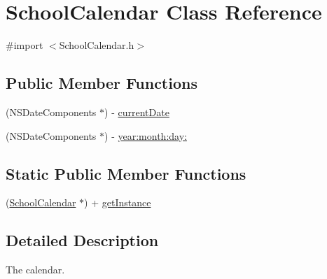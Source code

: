 \hypertarget{interface_school_calendar}{\section{\-School\-Calendar \-Class \-Reference}
\label{interface_school_calendar}
}


{\ttfamily \#import $<$\-School\-Calendar.\-h$>$}

\subsection*{\-Public \-Member \-Functions}
\begin{DoxyCompactItemize}
\item 
(\-N\-S\-Date\-Components $\ast$) -\/ \hyperlink{interface_school_calendar_ac248452ac8a11d6c1291c5e3699d246d}{current\-Date}
\item 
(\-N\-S\-Date\-Components $\ast$) -\/ \hyperlink{interface_school_calendar_a2d760eb48c052f5011e128285a2c6689}{year\-:month\-:day\-:}
\end{DoxyCompactItemize}
\subsection*{\-Static \-Public \-Member \-Functions}
\begin{DoxyCompactItemize}
\item 
(\hyperlink{interface_school_calendar}{\-School\-Calendar} $\ast$) + \hyperlink{interface_school_calendar_ae78cb8d9a4b506d36b3a6819650af189}{get\-Instance}
\end{DoxyCompactItemize}


\subsection{\-Detailed \-Description}
\-The calendar. 

